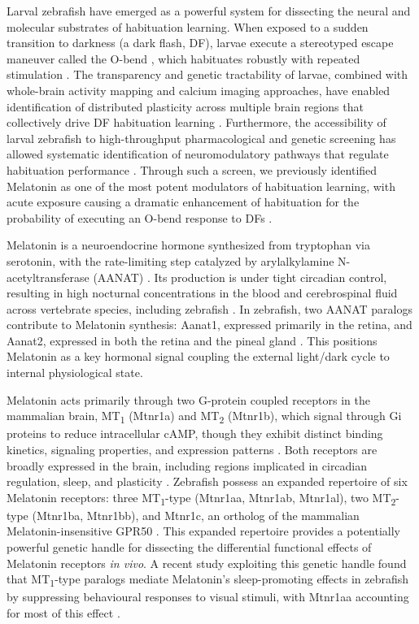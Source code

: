 \documentclass[9.5pt]{RandlettLab_elife}            %
\begin{document}
Larval zebrafish have emerged as a powerful system for dissecting the neural and molecular substrates of habituation learning.
When exposed to a sudden transition to darkness (a dark flash, DF), larvae execute a stereotyped escape maneuver called the O-bend \citep{Burgess2007-2}, which habituates robustly with repeated stimulation \citep{wolman_chemical_2011, Randlett2019-fj}.
The transparency and genetic tractability of larvae, combined with whole-brain activity mapping and calcium imaging approaches, have enabled identification of distributed plasticity across multiple brain regions that collectively drive DF habituation learning \citep{Randlett2019-fj, Lamire2023-he}. 
Furthermore, the accessibility of larval zebrafish to high-throughput pharmacological and genetic screening has allowed systematic identification of neuromodulatory pathways that regulate habituation performance \citep{wolman_chemical_2011, Wolman2015}.
Through such a screen, we previously identified Melatonin as one of the most potent modulators of habituation learning, with acute exposure causing a dramatic enhancement of habituation for the probability of executing an O-bend response to DFs \citep{Lamire2023-he}.

Melatonin is a neuroendocrine hormone synthesized from tryptophan via serotonin, with the rate-limiting step catalyzed by arylalkylamine N-acetyltransferase (AANAT) \citep{Ganguly2002}.
Its production is under tight circadian control, resulting in high nocturnal concentrations in the blood and cerebrospinal fluid across vertebrate species, including zebrafish \citep{Falcn2009, Cahill1996, Gandhi2015_NEURON}.
In zebrafish, two AANAT paralogs contribute to Melatonin synthesis: Aanat1, expressed primarily in the retina, and Aanat2, expressed in both the retina and the pineal gland \citep{Gandhi2015_NEURON, Hill2026}.
This positions Melatonin as a key hormonal signal coupling the external light/dark cycle to internal physiological state.

Melatonin acts primarily through two G-protein coupled receptors in the mammalian brain, MT\textsubscript{1} (Mtnr1a) and MT\textsubscript{2} (Mtnr1b), which signal through Gi proteins to reduce intracellular cAMP, though they exhibit distinct binding kinetics, signaling properties, and expression patterns \citep{Dubocovich2005, Liu2016, Cecon2017}.
Both receptors are broadly expressed in the brain, including regions implicated in circadian regulation, sleep, and plasticity \citep{Ng2017, Klosen2019}.
Zebrafish possess an expanded repertoire of six Melatonin receptors: three MT\textsubscript{1}-type (Mtnr1aa, Mtnr1ab, Mtnr1al), two MT\textsubscript{2}-type (Mtnr1ba, Mtnr1bb), and Mtnr1c, an ortholog of the mammalian Melatonin-insensitive GPR50 \citep{Hill2026}.
This expanded repertoire provides a potentially powerful genetic handle for dissecting the differential functional effects of Melatonin receptors \emph{in vivo}.
A recent study exploiting this genetic handle found that MT\textsubscript{1}-type paralogs mediate Melatonin's sleep-promoting effects in zebrafish by suppressing behavioural responses to visual stimuli, with Mtnr1aa accounting for most of this effect \citep{Hill2026}.
\end{document}
